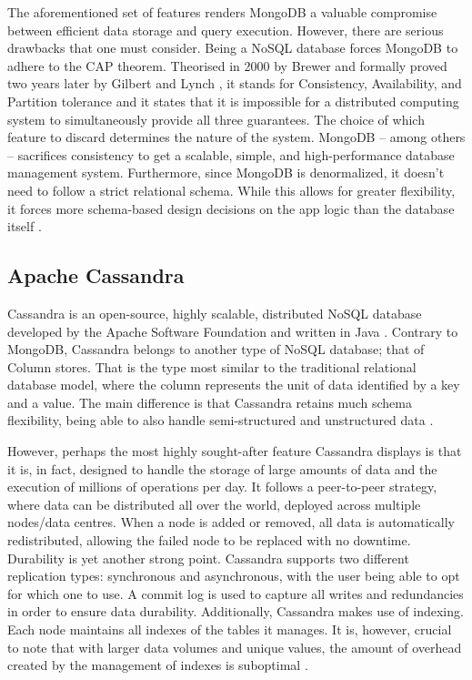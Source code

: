 \documentclass[conference]{IEEEtran}
\begin{document}
The aforementioned set of features renders MongoDB a valuable compromise between efficient data storage and query execution. However, there are serious drawbacks that one must consider. Being a NoSQL database forces MongoDB to adhere to the CAP theorem. Theorised in 2000 by Brewer \cite{b16} and formally proved two years later by Gilbert and Lynch \cite{b17, b18}, it stands for Consistency, Availability, and Partition tolerance and it states that it is impossible for a distributed computing system to simultaneously provide all three guarantees. The choice of which feature to discard determines the nature of the system. MongoDB – among others – sacrifices consistency to get a scalable, simple, and high-performance database management system. Furthermore, since MongoDB is denormalized, it doesn’t need to follow a strict relational schema. While this allows for greater flexibility, it forces more schema-based design decisions on the app logic than the database itself \cite{b10, b15}.


\subsection{Apache Cassandra}

Cassandra is an open-source, highly scalable, distributed NoSQL database developed by the Apache Software Foundation and written in Java \cite{b14, b19}. Contrary to MongoDB, Cassandra belongs to another type of NoSQL database; that of Column stores. That is the type most similar to the traditional relational database model, where the column represents the unit of data identified by a key and a value. The main difference is that Cassandra retains much schema flexibility, being able to also handle semi-structured and unstructured data \cite{b14}.

However, perhaps the most highly sought-after feature Cassandra displays is that it is, in fact, designed to handle the storage of large amounts of data and the execution of millions of operations per day. It follows a peer-to-peer strategy, where data can be distributed all over the world, deployed across multiple nodes/data centres. When a node is added or removed, all data is automatically redistributed, allowing the failed node to be replaced with no downtime.
Durability is yet another strong point. Cassandra supports two different replication types: synchronous and asynchronous, with the user being able to opt for which one to use. A commit log is used to capture all writes and redundancies in order to ensure data durability.
Additionally, Cassandra makes use of indexing. Each node maintains all indexes of the tables it manages. It is, however, crucial to note that with larger data volumes and unique values, the amount of overhead created by the management of indexes is suboptimal \cite{b14}.
\end{document}
